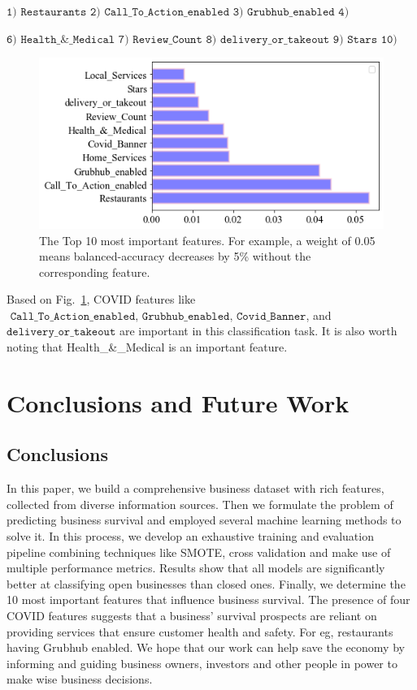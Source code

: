 \documentclass{article}
\begin{document}
$\texttt{
1) Restaurants                    
2) Call\_To\_Action\_enabled                 
3) Grubhub\_enabled                   
4) Home\_Services
5) Covid\_Banner}$ 

$\texttt{
6) Health\_\&\_Medical 
7) Review\_Count                    
8) delivery\_or\_takeout                 
9) Stars
10) Local\_Services} $

\begin{figure}[hbpt]
    \centering
    \includegraphics[width=0.7\linewidth]{signi_feature.png}
    \caption{The Top 10 most important features. For example, a weight of 0.05 means balanced-accuracy decreases by 5\% without the corresponding feature. }
    \label{fig:sig}  %
\end{figure}


Based on Fig.~\ref{fig:sig}, COVID features like $\texttt{ Call\_To\_Action\_enabled, Grubhub\_enabled, Covid\_Banner} $, and $\texttt{delivery\_or\_takeout} $ are important in this classification task. It is also worth noting that Health\_\&\_Medical is an important feature. 



\section{Conclusions and Future Work}

\subsection{Conclusions}



In this paper, we build a comprehensive business dataset with rich features, collected from diverse information sources. Then we formulate the problem of predicting business survival and employed several machine learning methods to solve it. In this process, we develop an exhaustive training and evaluation pipeline combining techniques like SMOTE, cross validation and make use of multiple performance metrics. Results show that all models are significantly better at classifying open businesses than closed ones. Finally, we determine the 10 most important features that influence business survival. The presence of four COVID features suggests that a business' survival prospects are reliant on providing services that ensure customer health and safety. For eg, restaurants having Grubhub enabled. We hope that our work can help save the economy by informing and guiding business owners, investors and other people in power to make wise business decisions.  
\end{document}
